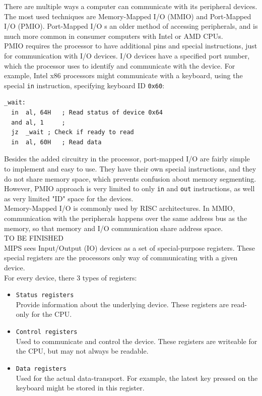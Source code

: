 There are multiple ways a computer can communicate with its peripheral devices.
The most used techniques are Memory-Mapped I/O (MMIO) and Port-Mapped I/O
(PMIO). Port-Mapped I/O s an older method of accessing peripherals, and is much
more common in consumer computers with Intel or AMD CPUs\cite{intelmanual}.\\
PMIO requires the processor to have additional pins and special instructions,
just for communication with I/O devices. I/O devices have a specified port
number, which the processor uses to identify and communicate with the device.
For example, Intel x86 processors might communicate with a keyboard, using the
special \texttt{in} instruction, specifying keyboard ID
\texttt{0x60}\cite{intel:pch}\cite{osdev:io_ports}:
\begin{lstlisting}[language={[x86masm]Assembler}]
_wait:
  in  al, 64H   ; Read status of device 0x64
  and al, 1     ;
  jz  _wait	; Check if ready to read
  in  al, 60H   ; Read data
\end{lstlisting}
Besides the added circuitry in the processor, port-mapped I/O are fairly
simple to implement and easy to use. They have their own special instructions,
and they do not share memory space, which prevents confusion about
memory segmenting.
However, PMIO approach is very limited to only \texttt{in} and \texttt{out}
instructions, as well as very limited "ID" space for the devices.\\

Memory-Mapped I/O is commonly used by RISC architectures. In MMIO,
communication with the peripherals happens over the same address bus as the
memory, so that memory and I/O communication share address space.
\\
TO BE FINISHED
\\


MIPS sees Input/Output (IO) devices as a set of special-purpose registers. These
special registers are the processors only way of communicating with a given
device.\\
For every device, there 3 types of registers\cite{cs_uwm:memory_mapped_io}:
\begin{itemize}
	\item \texttt{Status registers}\\
	Provide information about the underlying device. These registers are
	read-only for the CPU.

	\item \texttt{Control registers}\\
	Used to communicate and control the device. These registers are
	writeable for the CPU, but may not always be readable.

	\item \texttt{Data registers}\\
	Used for the actual data-transport. For example, the latest key pressed
	on the keyboard might be stored in this register.
\end{itemize}

